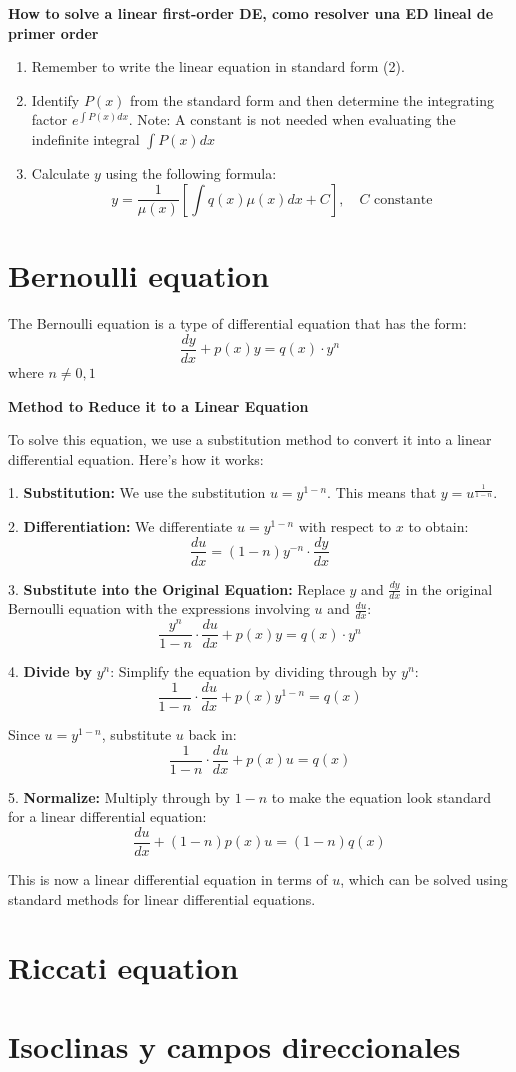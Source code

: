 \textbf{How to solve a linear first-order DE, como resolver una ED lineal de primer order}

\begin{enumerate}[label=\roman*)]
    \item Remember to write the linear equation in standard form (2).
    \item Identify $P(x)$ from the standard form and then determine the integrating factor $e^{\int P(x)dx}$. Note: A constant is not needed when evaluating the indefinite integral $\int P(x)dx$
    \item Calculate $y$ using the following formula:
        $$y = \frac{1}{\mu(x)}\left[\int q(x)\mu(x)dx + C\right], \quad C \text{ constante}$$
\end{enumerate}

\section{Bernoulli equation}
The Bernoulli equation is a type of differential equation that has the form:
\[
\frac{d y}{d x} + p(x) y = q(x) \cdot y^n
\]
where \( n \neq 0, 1 \)

\textbf{Method to Reduce it to a Linear Equation}

To solve this equation, we use a substitution method to convert it into a linear differential equation. Here's how it works:

1. \textbf{Substitution:} 
   We use the substitution $u = y^{1-n}$. This means that $y = u^{\frac{1}{1-n}}$.

2. \textbf{Differentiation:} 
   We differentiate $u = y^{1-n}$ with respect to $x$ to obtain:
   $$\frac{du}{dx} = (1-n)y^{-n} \cdot \frac{dy}{dx}$$

3. \textbf{Substitute into the Original Equation:} 
   Replace $y$ and $\frac{dy}{dx}$ in the original Bernoulli equation with the expressions involving $u$ and $\frac{du}{dx}$:
   $$\frac{y^n}{1-n} \cdot \frac{du}{dx} + p(x)y = q(x) \cdot y^n$$

4. \textbf{Divide by} $y^n$: 
   Simplify the equation by dividing through by $y^n$:
   $$\frac{1}{1-n} \cdot \frac{du}{dx} + p(x)y^{1-n} = q(x)$$

   Since $u = y^{1-n}$, substitute $u$ back in:
   $$\frac{1}{1-n} \cdot \frac{du}{dx} + p(x)u = q(x)$$

5. \textbf{Normalize:} 
   Multiply through by $1-n$ to make the equation look standard for a linear differential equation:
   $$\frac{du}{dx} + (1-n)p(x)u = (1-n)q(x)$$


This is now a linear differential equation in terms of \( u \), which can be solved using standard methods for linear differential equations.

\section{Riccati equation}

\section{Isoclinas y campos direccionales}
